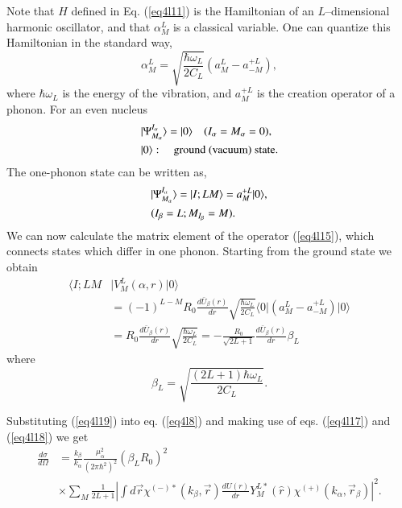 \begin{subappendices}
Note that $H$ defined in Eq. (\ref{eq4l11}) is the Hamiltonian of an $L$--dimensional harmonic oscillator, and that $\alpha_M^L$ is a classical variable. One can quantize this Hamiltonian in the standard way,
\begin{equation}\label{eq4l16}
\alpha_M^L=\sqrt{\frac{\hbar \omega_L}{2 C_L}}(a_M^L-a^{+L}_{-M}),
\end{equation}
where $\hbar \omega_L$ is the energy of the vibration, and $a^{+L}_{M}$ is the creation operator of a phonon. For an even nucleus
\begin{align}\label{eq4l17}
& \vert \Psi^{I_\alpha}_{M_\alpha}\rangle=\vert 0\rangle \quad (I_\alpha=M_\alpha=0),\\
& \vert 0\rangle:\quad \text{ground (vacuum) state}. \notag
\end{align}
The one-phonon state can be written as,
\begin{align}\label{eq4l18}
& \vert \Psi^{I_\alpha}_{M_\alpha}\rangle=\vert I;LM \rangle =a^{+L}_{M} \vert 0\rangle,\\
& (I_\beta=L;M_{I_\beta}=M). \notag
\end{align}
We can now calculate the matrix element of the operator (\ref{eq4l15}), which connects states which differ in one phonon. Starting from the ground state we obtain
\begin{equation}\label{eq4l19}
\begin{split}
\langle  I;LM & \vert V^L_M (\alpha,r)\vert 0\rangle\\
&=(-1)^{L-M}R_0 \frac{d \bar U_\beta (r)}{d r} \sqrt{\frac{\hbar \omega_L}{2 C_L}}
\langle  0\vert(a_M^L-a^{+L}_{-M})\vert 0\rangle\\
& =R_0 \frac{d \bar U_\beta (r)}{d r} \sqrt{\frac{\hbar \omega_L}{2 C_L}}=
-\frac{R_0}{\sqrt{2L+1}} \frac{d \bar U_\beta (r)}{d r} \beta_L
\end{split}
\end{equation}
where
\begin{equation}\label{eq4l20}
 \beta_L=\sqrt{\frac{(2L+1)\hbar \omega_L}{2 C_L}}.
\end{equation}


Substituting (\ref{eq4l19}) into eq. (\ref{eq4l8}) and making use of eqs. (\ref{eq4l17}) and (\ref{eq4l18}) we get
\begin{equation}\label{eq4l21}
\begin{split}
\frac{d\sigma}{d\Omega}&=\frac{k_\beta}{k_\alpha}\frac{\mu_\alpha^2}{(2 \pi \hbar^2)^2}(\beta_L R_0)^2\\
&\times\sum_{M}\frac{1}{2L+1}
\left\vert
\int d\vec r \chi^{(-)*}(k_\beta,\vec{r})
\frac{d  U (r)}{d r} Y_M^{L*}(\hat{r})\chi^{(+)}(k_\alpha,\vec{r}_\beta)\right\vert^2.
\end{split}
\end{equation}



\end{subappendices}
